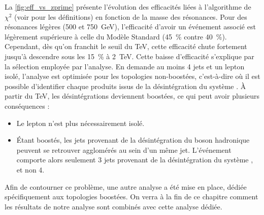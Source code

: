 La \cref{fig:eff_vs_zprime} présente l'évolution des efficacités liées à l'algorithme de $\chi^2$ (voir  pour les définitions) en fonction de la masse des résonances. Pour des résonances légères (\num{500} et \SI{750}{\GeV}), l'efficacité d'avoir un événement associé est légèrement supérieure à celle du Modèle Standard (\tilde\SI{45}{\%} contre \tilde\SI{40}{\%}). Cependant, dès qu'on franchit le seuil du \si{\TeV}, cette efficacité chute fortement jusqu'à descendre sous les \SI{15}{\%} à \SI{2}{\TeV}. Cette baisse d'efficacité s'explique par la sélection employée par l'analyse. En demande au moins 4 jets et un lepton isolé, l'analyse est optimisée pour les topologies non-boostées, c'est-à-dire où il est possible d'identifier chaque produits issus de la désintégration du système \ttbar. À partir du \si{\TeV}, les désintégrations deviennent boostées, ce qui peut avoir plusieurs conséquences :
\begin{itemize}
  \item Le lepton n'est plus nécessairement isolé.
  \item Étant boostés, les jets provenant de la désintégration du boson \PW hadronique peuvent se retrouver agglomérés au sein d'un même jet. L'événement comporte alors seulement 3 jets provenant de la désintégration du système \ttbar, et non 4.
\end{itemize}
Afin de contourner ce problème, une autre analyse a été mise en place, dédiée spécifiquement aux topologies boostées. On verra à la fin de ce chapitre comment les résultats de notre analyse sont combinés avec cette analyse dédiée.

\medskip

